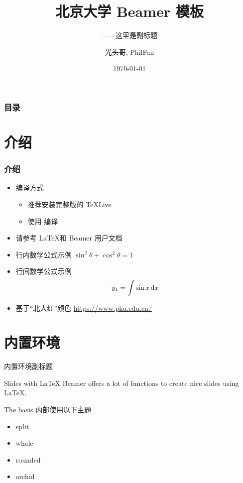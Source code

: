 \documentclass[10pt,aspectratio=169]{beamer}
\title[北京大学 Beamer 模板]{北京大学 Beamer 模板}
\subtitle{——这里是副标题}
\author[Guang Touge, PhilFan]{光头哥, PhilFan}
\institute[PKU]{北京大学}
\date{\today}
\begin{document}
\begin{frame}
	\titlepage
\end{frame}				%

\begin{frame}
	\frametitle{目录}
	\tableofcontents
\end{frame}				%

\section{介绍}
\begin{frame}
	\frametitle{介绍}

	\begin{itemize}
		\item {编译方式}
		      \begin{itemize}
			      \item  推荐安装完整版的 TeXLive
			      \item 使用 \XeLaTeX 编译
		      \end{itemize}
		\item 请参考 \LaTeX 和 Beamer 用户文档

		\item 行内数学公式示例 $\sin^2 \theta + \cos^2 \theta = 1$
		\item {行间数学公式示例 \begin{equation}
			      y_{1}=\int \sin x\, {\rm d}x
		      \end{equation}	 }
		\item 基于“北大红”颜色 \url{https://www.pku.edu.cn/}
	\end{itemize}
\end{frame}

\section{内置环境}
\begin{frame}{内置环境}{副标题}
	\begin{block}{Slides with \LaTeX}
		Beamer offers a lot of functions to create nice slides using \LaTeX.
	\end{block}

	\begin{block}{The basis}
		内部使用以下主题
		\begin{itemize}
			\item split
			\item whale
			\item rounded
			\item orchid
		\end{itemize}
	\end{block}
\end{frame}
\end{document}
